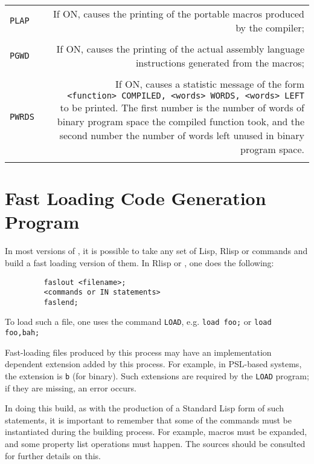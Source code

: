 \begin{tabular}{l r}
{\tt PLAP} & \parbox[t]{\reduceboxwidth}{If ON, causes the printing of the
portable macros produced by the compiler;} \\ \\

{\tt PGWD} & \parbox[t]{\reduceboxwidth}{If ON, causes the printing of the
actual assembly language instructions generated from the macros;} \\ \\

{\tt PWRDS} & \parbox[t]{\reduceboxwidth}{If ON, causes a statistic
message of the form \\
{\tt    <function> COMPILED, <words> WORDS, <words> LEFT} \\
to be printed.  The first number is the number of words of binary
program space the compiled function took, and the second number
the number of words left unused in binary program space.} \\ \\
\end{tabular}

\section{Fast Loading Code Generation Program} 
\label{sec-load}
In most versions of {\REDUCE}, it is possible to take any set of Lisp, Rlisp
or {\REDUCE} commands and build a fast loading version of them. In Rlisp or
{\REDUCE}, one does the following:
\begin{verbatim}
         faslout <filename>;
         <commands or IN statements>
         faslend;
\end{verbatim}
To load such a file, one uses the command {\tt LOAD}, 
e.g. {\tt load foo;}
or {\tt load foo,bah;}

Fast-loading files produced by this process may have an implementation
dependent extension added by this process. For example, in PSL-based systems,
the extension is {\tt b} (for binary).  Such extensions are required by
the {\tt LOAD} program; if they are missing, an error occurs.

In doing this build, as with the production of a Standard Lisp form of
such statements, it is important to remember that some of the commands
must be instantiated during the building process.  For example, macros
must be expanded, and some property list operations must happen.
The {\REDUCE} sources should be consulted for further details on this.


